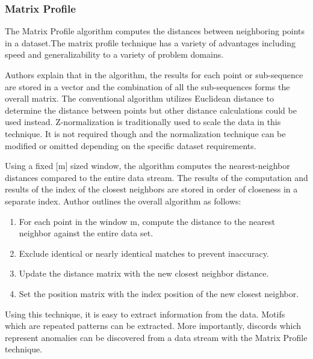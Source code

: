 \subsubsection{Matrix Profile} %
\label{ref_matrix-profile-alg}
The Matrix Profile algorithm computes the distances between neighboring points in a dataset.The matrix profile technique has a variety of advantages including speed and generalizability to a variety of problem domains. 

Authors \cite{yeh2016matrix-profile-1} explain that in the algorithm, the results for each point or sub-sequence are stored in a vector and the combination of all the sub-sequences forms the overall matrix. The conventional algorithm utilizes Euclidean distance to determine the distance between points but other distance calculations could be used instead. Z-normalization is traditionally used to scale the data in this technique. It is not required though and the normalization technique can be modified or omitted depending on the specific dataset requirements.

Using a fixed [m] sized window, the algorithm computes the nearest-neighbor distances compared to the entire data stream. The results of the computation and results of the index of the closest neighbors are stored in order of closeness in a separate index. Author \cite{matrix-profile-intro} outlines the overall algorithm as follows:
\begin{enumerate}
    \item For each point in the window m, compute the distance to the nearest neighbor against the entire data set.
    \item Exclude identical or nearly identical matches to prevent inaccuracy.
    \item Update the distance matrix with the new closest neighbor distance.
    \item Set the position matrix with the index position of the new closest neighbor.
\end{enumerate}

Using this technique, it is easy to extract information from the data. Motifs which are repeated patterns can be extracted. More importantly, discords which represent anomalies can be discovered from a data stream with the Matrix Profile technique. 


